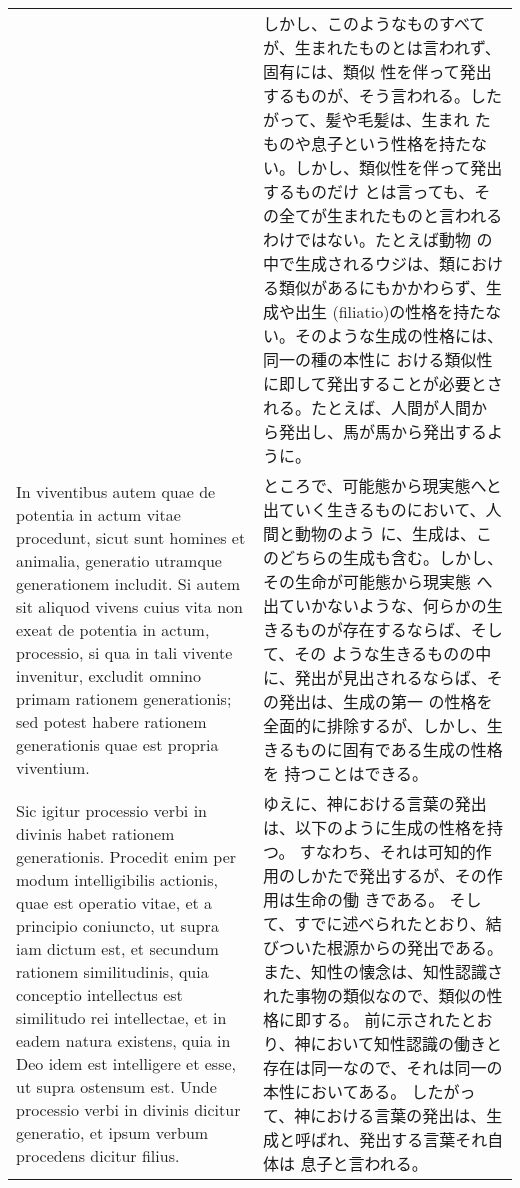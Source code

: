 \documentclass[10pt]{jsarticle} %
\begin{document}
\begin{longtable}{p{21em}p{21em}}
&

しかし、このようなものすべてが、生まれたものとは言われず、固有には、類似
 性を伴って発出するものが、そう言われる。したがって、髪や毛髪は、生まれ
 たものや息子という性格を持たない。しかし、類似性を伴って発出するものだけ
とは言っても、その全てが生まれたものと言われるわけではない。たとえば動物
 の中で生成されるウジは、類における類似があるにもかかわらず、生成や出生
 (filiatio)の性格を持たない。そのような生成の性格には、同一の種の本性に
 おける類似性に即して発出することが必要とされる。たとえば、人間が人間か
 ら発出し、馬が馬から発出するように。



\\


In
viventibus autem quae de potentia in actum vitae procedunt, sicut sunt
homines et animalia, generatio utramque generationem includit. Si autem
sit aliquod vivens cuius vita non exeat de potentia in actum, processio,
si qua in tali vivente invenitur, excludit omnino primam rationem
generationis; sed potest habere rationem generationis quae est propria
viventium. 



&

ところで、可能態から現実態へと出ていく生きるものにおいて、人間と動物のよう
 に、生成は、このどちらの生成も含む。しかし、その生命が可能態から現実態
 へ出ていかないような、何らかの生きるものが存在するならば、そして、その
 ような生きるものの中に、発出が見出されるならば、その発出は、生成の第一
 の性格を全面的に排除するが、しかし、生きるものに固有である生成の性格を
 持つことはできる。

\\



Sic igitur processio verbi in divinis habet rationem
generationis. Procedit enim per modum intelligibilis actionis, quae est
operatio vitae, et a principio coniuncto, ut supra iam dictum est, et
secundum rationem similitudinis, quia conceptio intellectus est
similitudo rei intellectae, et in eadem natura existens, quia in Deo
idem est intelligere et esse, ut supra ostensum est. Unde processio
verbi in divinis dicitur generatio, et ipsum verbum procedens dicitur
filius.


&

ゆえに、神における言葉の発出は、以下のように生成の性格を持つ。
すなわち、それは可知的作用のしかたで発出するが、その作用は生命の働
 きである。
そして、すでに述べられたとおり、結びついた根源からの発出である。
また、知性の懐念は、知性認識された事物の類似なので、類似の性格に即する。
前に示されたとおり、神において知性認識の働きと存在は同一なので、それは同一の本性においてある。
したがって、神における言葉の発出は、生成と呼ばれ、発出する言葉それ自体は
 息子と言われる。



\end{longtable}
\end{document}
